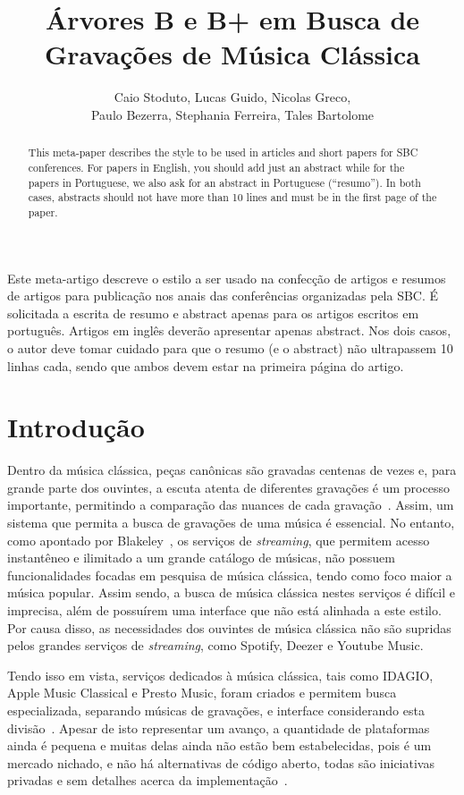 \documentclass[12pt]{article}
\title{Árvores B e B\nolinebreak+ em Busca de Gravações de Música Clássica\\}
\author{Caio Stoduto\inst{1}, Lucas Guido\inst{1}, Nicolas Greco\inst{1},\\
Paulo Bezerra\inst{1}, Stephania Ferreira\inst{1}, Tales Bartolome\inst{1}}
\begin{document}
 

\maketitle

\begin{abstract}
  This meta-paper describes the style to be used in articles and short papers
  for SBC conferences. For papers in English, you should add just an abstract
  while for the papers in Portuguese, we also ask for an abstract in Portuguese
  (``resumo''). In both cases, abstracts should not have more than 10 lines and
  must be in the first page of the paper.
\end{abstract}
     
\begin{resumo} 
  Este meta-artigo descreve o estilo a ser usado na confecção de artigos e
  resumos de artigos para publicação nos anais das conferências organizadas pela
  SBC. É solicitada a escrita de resumo e abstract apenas para os artigos
  escritos em português. Artigos em inglês deverão apresentar apenas abstract.
  Nos dois casos, o autor deve tomar cuidado para que o resumo (e o abstract)
  não ultrapassem 10 linhas cada, sendo que ambos devem estar na primeira página
  do artigo.
\end{resumo}

\section{Introdução}
Dentro da música clássica, peças canônicas são gravadas centenas de vezes e,
para grande parte dos ouvintes, a escuta atenta de diferentes gravações é um
processo importante, permitindo a comparação das nuances de cada
gravação~\cite{Bl:25}. Assim, um sistema que permita a busca de gravações de uma
música é essencial. No entanto, como apontado por Blakeley~\cite{Bl:25}, os
serviços de \emph{streaming}, que permitem acesso instantêneo e ilimitado a um
grande catálogo de músicas, não possuem funcionalidades focadas em pesquisa de
música clássica, tendo como foco maior a música popular. Assim sendo, a busca de
música clássica nestes serviços é difícil e imprecisa, além de possuírem uma
interface que não está alinhada a este estilo. Por causa disso, as necessidades
dos ouvintes de música clássica não são supridas pelos grandes serviços de
\emph{streaming}, como Spotify, Deezer e Youtube Music.

Tendo isso em vista, serviços dedicados à música clássica, tais como IDAGIO,
Apple Music Classical e Presto Music, foram criados e permitem busca
especializada, separando músicas de gravações, e interface considerando esta
divisão~\cite{Bl:25}. Apesar de isto representar um avanço, a quantidade de
plataformas ainda é pequena e muitas delas ainda não estão bem estabelecidas,
pois é um mercado nichado, e não há alternativas de código aberto, todas são
iniciativas privadas e sem detalhes acerca da implementação~\cite{Bl:25}.
\end{document}
